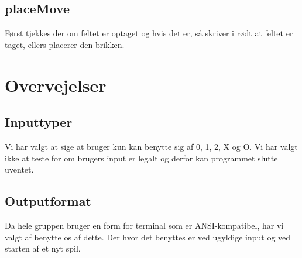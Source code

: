 \documentclass[a4paper,12pt]{article}
\begin{document}
\subsection*{placeMove}
Først tjekkes der om feltet er optaget og hvis det er, så skriver i rødt at feltet er taget, ellers placerer den brikken.


\section*{Overvejelser}
\subsection*{Inputtyper}
Vi har valgt at sige at bruger kun kan benytte sig af 0, 1, 2, X og O. Vi har valgt ikke
at teste for om brugers input er legalt og derfor kan programmet slutte uventet.

\subsection*{Outputformat}
Da hele gruppen bruger en form for terminal som er ANSI-kompatibel, har vi
valgt af benytte os af dette. Der hvor det benyttes er ved ugyldige input og ved
starten af et nyt spil.
\end{document}

